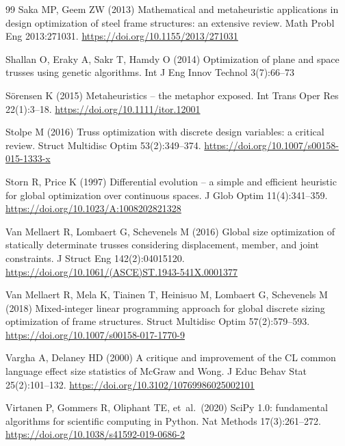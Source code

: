 \documentclass[lineno,pdflatex,sn-mathphys-num]{sn-jnl}
\begin{document}
\begin{thebibliography}{99}
Saka MP, Geem ZW (2013) Mathematical and metaheuristic applications in design optimization of steel frame structures: an extensive review. Math Probl Eng 2013:271031. \url{https://doi.org/10.1155/2013/271031}

Shallan O, Eraky A, Sakr T, Hamdy O (2014) Optimization of plane and space trusses using genetic algorithms. Int J Eng Innov Technol 3(7):66--73

S\"orensen K (2015) Metaheuristics -- the metaphor exposed. Int Trans Oper Res 22(1):3--18. \url{https://doi.org/10.1111/itor.12001}

Stolpe M (2016) Truss optimization with discrete design variables: a critical review. Struct Multidisc Optim 53(2):349--374. \url{https://doi.org/10.1007/s00158-015-1333-x}

Storn R, Price K (1997) Differential evolution -- a simple and efficient heuristic for global optimization over continuous spaces. J Glob Optim 11(4):341--359. \url{https://doi.org/10.1023/A:1008202821328}

Van Mellaert R, Lombaert G, Schevenels M (2016) Global size optimization of statically determinate trusses considering displacement, member, and joint constraints. J Struct Eng 142(2):04015120. \url{https://doi.org/10.1061/(ASCE)ST.1943-541X.0001377}

Van Mellaert R, Mela K, Tiainen T, Heinisuo M, Lombaert G, Schevenels M (2018) Mixed-integer linear programming approach for global discrete sizing optimization of frame structures. Struct Multidisc Optim 57(2):579--593. \url{https://doi.org/10.1007/s00158-017-1770-9}

Vargha A, Delaney HD (2000) A critique and improvement of the CL common language effect size statistics of McGraw and Wong. J Educ Behav Stat 25(2):101--132. \url{https://doi.org/10.3102/10769986025002101}

Virtanen P, Gommers R, Oliphant TE, et~al.\ (2020) SciPy 1.0: fundamental algorithms for scientific computing in Python. Nat Methods 17(3):261--272. \url{https://doi.org/10.1038/s41592-019-0686-2}

\end{thebibliography}
\end{document}
